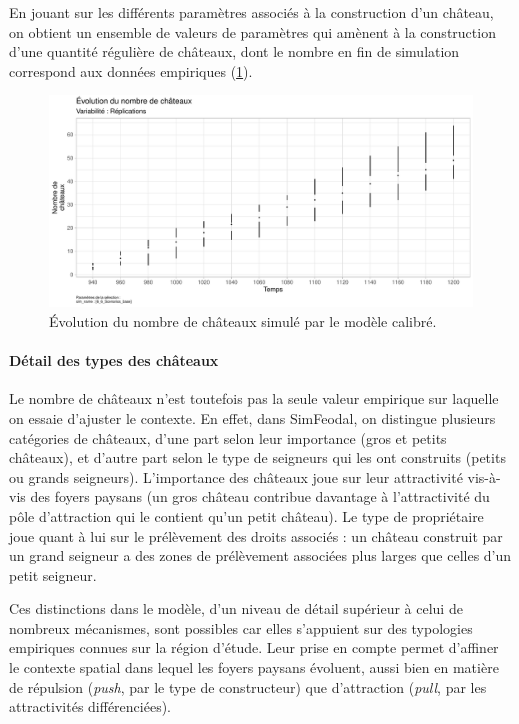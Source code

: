 En jouant sur les différents paramètres associés à la construction d'un château, on obtient un ensemble de valeurs de paramètres qui amènent à la construction d'une quantité régulière de châteaux, dont le nombre en fin de simulation correspond aux données empiriques (\cref{fig:calibrage-chateaux-nb}).

\begin{figure}[H]
	\centering
	\includegraphics[width=\linewidth]{img/results_6_6/Chateaux_Nb_Haut.pdf}
	\caption{Évolution du nombre de châteaux simulé par le modèle calibré. %
	}
	\label{fig:calibrage-chateaux-nb}
\end{figure}

\paragraph{Détail des types des châteaux}

Le nombre de châteaux n'est toutefois pas la seule valeur empirique sur laquelle on essaie d'ajuster le contexte.
En effet, dans SimFeodal, on distingue plusieurs catégories de châteaux, d'une part selon leur importance (gros et petits châteaux), et d'autre part selon le type de seigneurs qui les ont construits (petits ou grands seigneurs).
L'importance des châteaux joue sur leur attractivité vis-à-vis des foyers paysans (un gros château contribue davantage à l'attractivité du pôle d'attraction qui le contient qu'un petit château).
Le type de propriétaire joue quant à lui sur le prélèvement des droits associés : un château construit par un grand seigneur a des zones de prélèvement associées plus larges que celles d'un petit seigneur.

Ces distinctions dans le modèle, d'un niveau de détail supérieur à celui de nombreux mécanismes, sont possibles car elles s'appuient sur des typologies empiriques connues sur la région d'étude.
Leur prise en compte permet d'affiner le contexte spatial dans lequel les foyers paysans évoluent, aussi bien en matière de répulsion (\textit{push}, par le type de constructeur) que d'attraction (\textit{pull}, par les attractivités différenciées).


